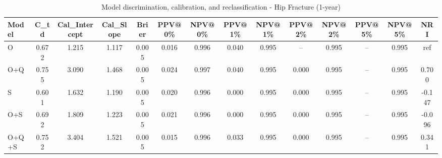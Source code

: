 \begin{table}[htbp]
\centering
\small
\caption{Model discrimination, calibration, and reclassification - Hip Fracture (1-year)}
\label{tab:perf_pd_1y}
\begin{tabular}{lccccccccccccc}
\toprule
Model & C\_td & Cal\_Intercept & Cal\_Slope & Brier & PPV@0\% & NPV@0\% & PPV@1\% & NPV@1\% & PPV@2\% & NPV@2\% & PPV@5\% & NPV@5\% & NRI \\
\midrule
O & 0.672 & 1.215 & 1.117 & 0.005 & 0.016 & 0.996 & 0.040 & 0.995 & -- & 0.995 & -- & 0.995 & ref \\
O+Q & 0.755 & 3.090 & 1.468 & 0.005 & 0.024 & 0.997 & 0.040 & 0.995 & 0.000 & 0.995 & -- & 0.995 & 0.700 \\
S & 0.601 & 1.632 & 1.190 & 0.005 & 0.020 & 0.996 & 0.000 & 0.995 & 0.000 & 0.995 & -- & 0.995 & -0.147 \\
O+S & 0.692 & 1.809 & 1.223 & 0.005 & 0.021 & 0.996 & 0.000 & 0.995 & 0.000 & 0.995 & -- & 0.995 & -0.096 \\
O+Q+S & 0.752 & 3.404 & 1.521 & 0.005 & 0.015 & 0.996 & 0.033 & 0.995 & 0.000 & 0.995 & -- & 0.995 & 0.341 \\
\bottomrule
\end{tabular}
\end{table}